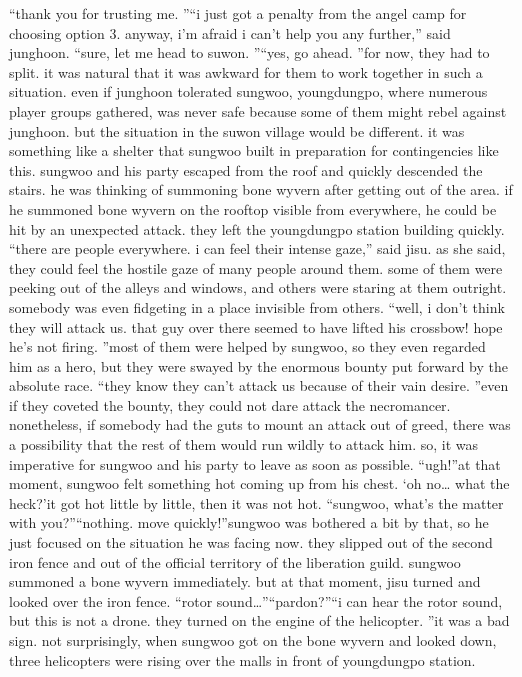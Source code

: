 “thank you for trusting me.
”“i just got a penalty from the angel camp for choosing option 3.
 anyway, i’m afraid i can’t help you any further,” said junghoon.
“sure, let me head to suwon.
”“yes, go ahead.
”for now, they had to split.
 it was natural that it was awkward for them to work together in such a situation.
 even if junghoon tolerated sungwoo, youngdungpo, where numerous player groups gathered, was never safe because some of them might rebel against junghoon.
but the situation in the suwon village would be different.
 it was something like a shelter that sungwoo built in preparation for contingencies like this.
sungwoo and his party escaped from the roof and quickly descended the stairs.
he was thinking of summoning bone wyvern after getting out of the area.
if he summoned bone wyvern on the rooftop visible from everywhere, he could be hit by an unexpected attack.
 they left the youngdungpo station building quickly.
“there are people everywhere.
 i can feel their intense gaze,” said jisu.
as she said, they could feel the hostile gaze of many people around them.
 some of them were peeking out of the alleys and windows, and others were staring at them outright.
 somebody was even fidgeting in a place invisible from others.
“well, i don’t think they will attack us.
 that guy over there seemed to have lifted his crossbow! hope he’s not firing.
”most of them were helped by sungwoo, so they even regarded him as a hero, but they were swayed by the enormous bounty put forward by the absolute race.
“they know they can’t attack us because of their vain desire.
”even if they coveted the bounty, they could not dare attack the necromancer.
nonetheless, if somebody had the guts to mount an attack out of greed, there was a possibility that the rest of them would run wildly to attack him.
 so, it was imperative for sungwoo and his party to leave as soon as possible.
“ugh!”at that moment, sungwoo felt something hot coming up from his chest.
‘oh no… what the heck?’it got hot little by little, then it was not hot.
“sungwoo, what’s the matter with you?”“nothing.
 move quickly!”sungwoo was bothered a bit by that, so he just focused on the situation he was facing now.
they slipped out of the second iron fence and out of the official territory of the liberation guild.
sungwoo summoned a bone wyvern immediately.
 but at that moment, jisu turned and looked over the iron fence.
“rotor sound…”“pardon?”“i can hear the rotor sound, but this is not a drone.
 they turned on the engine of the helicopter.
”it was a bad sign.
not surprisingly, when sungwoo got on the bone wyvern and looked down, three helicopters were rising over the malls in front of youngdungpo station.
